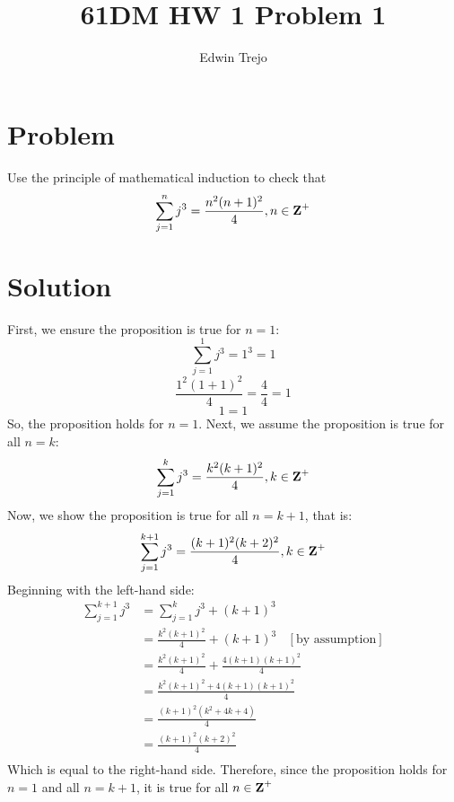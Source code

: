 \documentclass{article}
\title{61DM HW 1 Problem 1}
\author{Edwin Trejo}
\begin{document}
\maketitle

\section{Problem}
 Use the principle of mathematical induction to check that 
    \[\sum_{j=1}^{n}j^3=\frac{n^{2}(n+1)^2}{4}, n\in \mbox{\textbf{Z}}^+\]

\section{Solution}
First, we ensure the proposition is true for \(n=1\):
\[\sum_{j=1}^{1}j^3=1^3=1\]
\[\frac{1^{2}(1+1)^2}{4}=\frac{4}{4}=1\]
\[1=1\]
So, the proposition holds for \(n=1\). Next, we assume the proposition is true for all \(n=k\):
\[\sum_{j=1}^{k}j^3=\frac{k^{2}(k+1)^2}{4}, k\in \mbox{\textbf{Z}}^+\]
Now, we show the proposition is true for all \(n=k+1\), that is:
\[\sum_{j=1}^{k+1}j^3=\frac{(k+1)^{2}(k+2)^2}{4}, k\in \mbox{\textbf{Z}}^+\]
Beginning with the left-hand side:
\begin{align*}
    \sum_{j=1}^{k+1}j^3 &= \sum_{j=1}^{k}j^3 + (k+1)^3 \\
    &= \frac{k^{2}(k+1)^2}{4} + (k+1)^3 \ \ \ \ [\mbox{by assumption}] \\
    &= \frac{k^{2}(k+1)^2}{4} + \frac{4(k+1)(k+1)^2}{4} \\
    &= \frac{k^{2}(k+1)^2 + 4(k+1)(k+1)^2}{4} \\ 
    &= \frac{(k+1)^2(k^2+4k+4)}{4} \\
    &= \frac{(k+1)^2(k+2)^2}{4} \\
\end{align*}
Which is equal to the right-hand side. Therefore, since the proposition holds for \(n=1\) and all \(n=k+1\), it is true for all \(n\in\mbox{\textbf{Z}}^+\)
\end{document}
